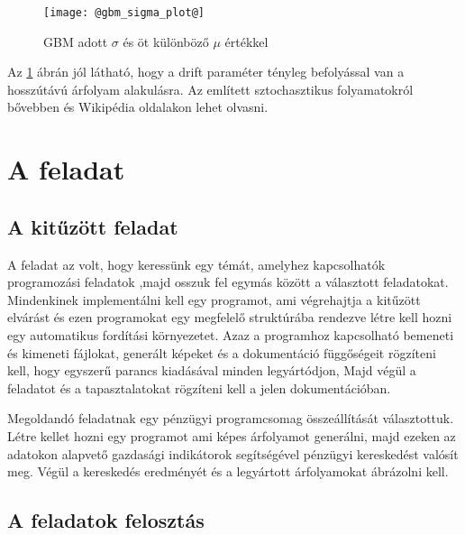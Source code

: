 \documentclass[a4paper, 12pt]{article}
\numberwithin{equation}{section}          %
\numberwithin{figure}{subsection}
\begin{document}
		\begin{figure}[h!]
			\begin{center}
				\texttt{[image: @gbm\_sigma\_plot@]}
			\end{center}
			\caption{GBM adott $\sigma$ és öt különböző $\mu$ értékkel}
			\label{fig:gbm}
		\end{figure}
		
		Az \ref{fig:gbm} ábrán jól látható, hogy a drift paraméter tényleg befolyással van
		a hosszútávú árfolyam alakulásra. Az említett sztochasztikus folyamatokról bővebben
		\cite{brown} és \cite{geobrown} Wikipédia oldalakon lehet olvasni.
		
	
	\clearpage
	
	\section{A feladat}
	
		\subsection{A kitűzött feladat}
	
		A feladat az volt, hogy keressünk egy témát, amelyhez kapcsolhatók programozási feladatok
		,majd osszuk fel egymás között a választott feladatokat. Mindenkinek implementálni kell
		egy programot, ami végrehajtja a kitűzött elvárást és ezen programokat egy megfelelő
		struktúrába rendezve létre kell hozni egy automatikus fordítási környezetet. Azaz 
		a programhoz kapcsolható bemeneti és kimeneti fájlokat, generált képeket és a dokumentáció 
		függőségeit rögzíteni kell, hogy egyszerű parancs kiadásával minden legyártódjon,
		Majd végül a feladatot és a tapasztalatokat rögzíteni kell a jelen dokumentációban.
		
		Megoldandó feladatnak egy pénzügyi programcsomag összeállítását választottuk.
		Létre kellet hozni egy programot ami képes árfolyamot generálni, majd ezeken az
		adatokon alapvető gazdasági indikátorok segítségével pénzügyi kereskedést valósít meg.
		Végül a kereskedés eredményét és a legyártott árfolyamokat ábrázolni kell.

	
		\subsection{A feladatok felosztás}
		
\end{document}
